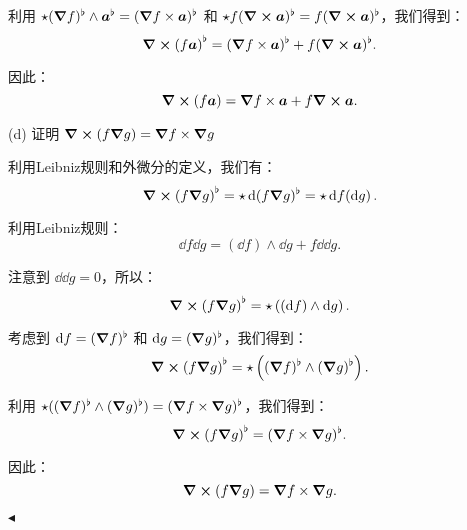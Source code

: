 \documentclass[11pt]{article}
\newenvironment{question}[2][Question]{\begin{trivlist}
\item[\hskip \labelsep {\bfseries #1}\hskip \labelsep {\bfseries #2.}]}{\hfill$\blacktriangleleft$\end{trivlist}}
\begin{document}
\begin{question}{5 (16') (外微分)}
    利用 \(\star (\grad f)^\flat \wedge \vb*{a}^\flat = (\grad f \times \vb*{a})^\flat\) 和 \(\star f (\curl \vb*{a})^\flat = f (\curl \vb*{a})^\flat\)，我们得到：
    \[
    \curl(f \vb*{a})^\flat = (\grad f \times \vb*{a})^\flat + f (\curl \vb*{a})^\flat.
    \]
    
    因此：
    \[
    \curl(f \vb*{a}) = \grad f \times \vb*{a} + f \curl \vb*{a}.
    \]
    
     (d) 证明 \(\curl(f \grad g) = \grad f \times \grad g\)
    
    利用Leibniz规则和外微分的定义，我们有：
    \[
    \curl(f \grad g)^\flat = \star \dd{(f \grad g)^\flat} = \star \dd{f (\dd{g})}.
    \]
    
    利用Leibniz规则：
    \[
    \dd{f \dd{g}} = (\dd{f}) \wedge \dd{g} + f \dd{\dd{g}}.
    \]
    
    注意到 \(\dd{\dd{g}} = 0\)，所以：
    \[
    \curl(f \grad g)^\flat = \star \left( (\dd{f}) \wedge \dd{g} \right).
    \]
    
    考虑到 \(\dd{f} = (\grad f)^\flat\) 和 \(\dd{g} = (\grad g)^\flat\)，我们得到：
    \[
    \curl(f \grad g)^\flat = \star \left( (\grad f)^\flat \wedge (\grad g)^\flat \right).
    \]
    
    利用 \(\star ((\grad f)^\flat \wedge (\grad g)^\flat) = (\grad f \times \grad g)^\flat\)，我们得到：
    \[
    \curl(f \grad g)^\flat = (\grad f \times \grad g)^\flat.
    \]
    
    因此：
    \[
    \curl(f \grad g) = \grad f \times \grad g.
    \]
    

    \end{question}

    
\end{document}
